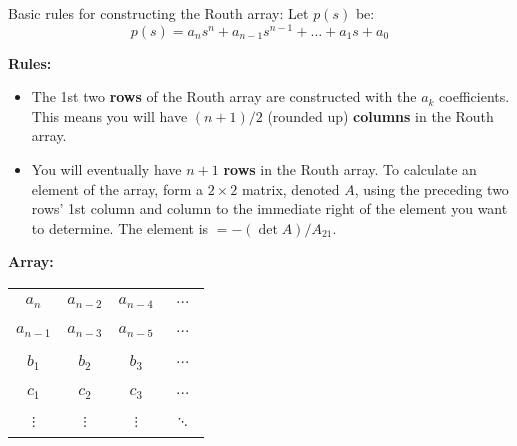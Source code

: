 \documentclass{book}
\begin{document}
Basic rules for constructing the Routh array: Let $ p(s) $ be:
\[ p(s) = a_ns^n + a_{n-1}s^{n-1} + \ldots + a_1s + a_0 \]
\begin{minipage}[t]{0.30\textwidth}
	\begin{center}
		\textbf{Rules:}
	\end{center}
	\begin{itemize}[leftmargin=*]
	\item The 1st two \textbf{rows} of the Routh array are constructed with the $ a_k $ coefficients. 
	This means you will have $ (n+1)/2 $ (rounded up) \textbf{columns} in the Routh array.
	\item You will eventually have $ n+1 $ \textbf{rows} in the Routh array. To calculate an element of the array, form a $ 2\times2 $ matrix, denoted $ A $, using the preceding two rows' 1st column and column to the immediate right of the element you want to determine. The element is $ = -(\det A)/A_{21} $. 
	\end{itemize} 
\end{minipage}
\begin{minipage}[t]{0.34\textwidth}
	\centering
	\textbf{Array:}
	\vspace{1em}
	
	\begin{tabular}{|c|c|c|c|}\hline
		&  &  &  \\ 
		$ a_n $ & $ a_{n-2} $ & $ a_{n-4} $ & $ \ \ldots\ $ \\ 
		&  &  &  \\ \hline
		&  &  &  \\ 
		$ a_{n-1} $ & $ a_{n-3} $ & $ a_{n-5} $ & $ \ \ldots\ $ \\
		&  &  &  \\ \hline
		&  &  &  \\ 
		$ b_1 $ & $ b_2 $ & $ b_3 $ & $ \ \ldots\ $ \\
		&  &  &  \\ \hline
		&  &  &  \\ 
		$ c_1 $ & $ c_2 $ & $ c_3 $ & $ \ \ldots\ $ \\
		&  &  &  \\ \hline
		&  &  &  \\ 
		$ \vdots $ & $ \vdots $ & $ \vdots $ & $ \ \ddots\ $ \\
		&  &  &  \\ \hline
	\end{tabular}
\end{minipage}
\end{document}
